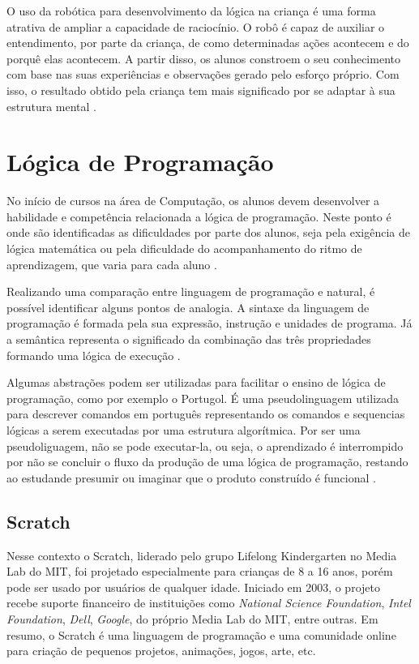 O uso da robótica para desenvolvimento da lógica na criança é uma forma atrativa de ampliar a capacidade de raciocínio. O robô é
capaz de auxiliar o entendimento, por parte da criança, de como determinadas ações acontecem e do porquê elas acontecem. A partir
disso, os alunos constroem o seu conhecimento com base nas suas experiências e observações gerado pelo esforço próprio. Com isso,
o resultado obtido pela criança tem mais significado por se adaptar à sua estrutura mental \cite{zilli:2004}.

\section{Lógica de Programação}
No início de cursos na área de Computação, os alunos devem desenvolver a habilidade e competência relacionada a lógica de programação.
Neste ponto é onde são identificadas as dificuldades por parte dos alunos, seja pela exigência de lógica matemática ou pela dificuldade
do acompanhamento do ritmo de aprendizagem, que varia para cada aluno .

Realizando uma comparação entre linguagem de programação e natural, é possível identificar alguns pontos de analogia. A sintaxe da linguagem
de programação é formada pela sua expressão, instrução e unidades de programa. Já a semântica representa o significado da combinação das três
propriedades formando uma lógica de execução \cite{ronnie:2013}.

Algumas abstrações podem ser utilizadas para facilitar o ensino de lógica de programação, como por exemplo o Portugol. É uma pseudolinguagem
utilizada para descrever comandos em português representando os comandos e sequencias lógicas a serem executadas por uma estrutura
algorítmica. Por ser uma pseudoliguagem, não se pode executar-la, ou seja, o aprendizado é interrompido por não se concluir o fluxo da
produção de uma lógica de programação, restando ao estudande presumir ou imaginar que o produto construído é funcional \cite{ronnie:2013}.

\subsection{Scratch}
Nesse contexto o Scratch, liderado pelo grupo Lifelong Kindergarten no Media Lab do MIT, foi projetado especialmente para crianças
de 8 a 16 anos, porém pode ser usado por usuários de qualquer idade. Iniciado em 2003, o projeto recebe suporte financeiro de
instituições como \textit{National Science Foundation}, \textit{Intel Foundation}, \textit{Dell}, \textit{Google}, do próprio 
Media Lab do MIT, entre outras. Em resumo, o Scratch é uma linguagem de programação e uma comunidade online para criação de
pequenos projetos, animações, jogos, arte, etc.

